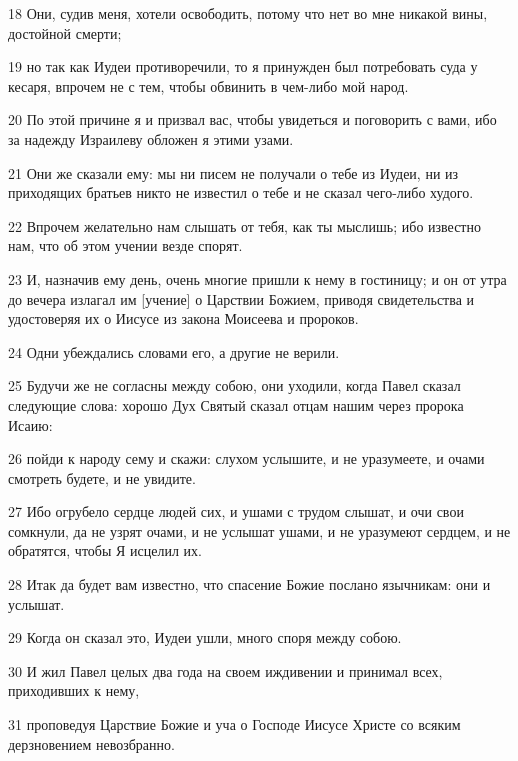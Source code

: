 \par 18 Они, судив меня, хотели освободить, потому что нет во мне никакой вины, достойной смерти;
\par 19 но так как Иудеи противоречили, то я принужден был потребовать суда у кесаря, впрочем не с тем, чтобы обвинить в чем-либо мой народ.
\par 20 По этой причине я и призвал вас, чтобы увидеться и поговорить с вами, ибо за надежду Израилеву обложен я этими узами.
\par 21 Они же сказали ему: мы ни писем не получали о тебе из Иудеи, ни из приходящих братьев никто не известил о тебе и не сказал чего-либо худого.
\par 22 Впрочем желательно нам слышать от тебя, как ты мыслишь; ибо известно нам, что об этом учении везде спорят.
\par 23 И, назначив ему день, очень многие пришли к нему в гостиницу; и он от утра до вечера излагал им [учение] о Царствии Божием, приводя свидетельства и удостоверяя их о Иисусе из закона Моисеева и пророков.
\par 24 Одни убеждались словами его, а другие не верили.
\par 25 Будучи же не согласны между собою, они уходили, когда Павел сказал следующие слова: хорошо Дух Святый сказал отцам нашим через пророка Исаию:
\par 26 пойди к народу сему и скажи: слухом услышите, и не уразумеете, и очами смотреть будете, и не увидите.
\par 27 Ибо огрубело сердце людей сих, и ушами с трудом слышат, и очи свои сомкнули, да не узрят очами, и не услышат ушами, и не уразумеют сердцем, и не обратятся, чтобы Я исцелил их.
\par 28 Итак да будет вам известно, что спасение Божие послано язычникам: они и услышат.
\par 29 Когда он сказал это, Иудеи ушли, много споря между собою.
\par 30 И жил Павел целых два года на своем иждивении и принимал всех, приходивших к нему,
\par 31 проповедуя Царствие Божие и уча о Господе Иисусе Христе со всяким дерзновением невозбранно.



